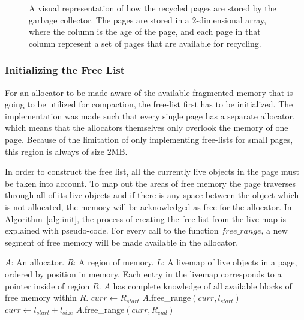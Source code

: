 \begin{figure}[H]
    \centering
    
    \caption{A visual representation of how the recycled pages are stored by the garbage collector. The pages are stored in a 2-dimensional array, where the column is the age of the page, and each page in that column represent a set of pages that are available for recycling.}
    \label{fig:generational_free_list_dict}
\end{figure}

\subsubsection{Initializing the Free List}
\label{sec:implement-init}
For an allocator to be made aware of the available fragmented memory that is going to be utilized for compaction, the free-list first has to be initialized. The implementation was made such that every single page has a separate allocator, which means that the allocators themselves only overlook the memory of one page. Because of the limitation of only implementing free-lists for small pages, this region is always of size $2$MB.

In order to construct the free list, all the currently live objects in the page must be taken into account. To map out the areas of free memory the page traverses through all of its live objects and if there is any space between the object which is not allocated, the memory will be acknowledged as free for the allocator. In Algorithm~\ref{alg:init}, the process of creating the free list from the live map is explained with pseudo-code. For every call to the function $free\_range$, a new segment of free memory will be made available in the allocator. 

\begin{algorithm}[H]{}
    \caption{$(A,R,L)$}
    \label{alg:init}
    \begin{algorithmic}[1]
        \Require 
        \Statex $A$: An allocator.
        \Statex $R$: A region of memory.
        \Statex $L$: A livemap of live objects in a page, ordered by position in memory. Each entry in the livemap corresponds to a pointer inside of region $R$. 
        \Ensure 
        \Statex $A$ has complete knowledge of all available blocks of free memory within $R$.
        \State $curr\gets R_{start}$ 
          
        \State $A$.free\_range$(curr, l_{start})$ 
        \EndIf
        \State $curr\gets l_{start} + l_{size}$ 
        \EndFor
        \State $A$.free\_range$(curr,R_{end})$ 
    \end{algorithmic}
\end{algorithm}

